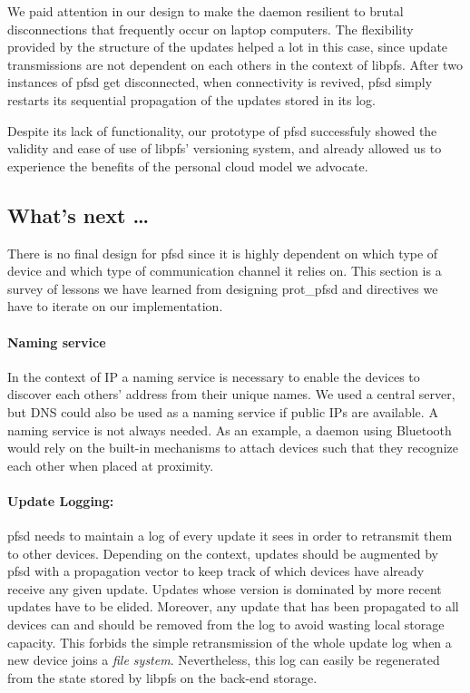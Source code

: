 We paid attention in our design to make the daemon resilient to brutal
disconnections that frequently occur on laptop computers. The
flexibility provided by the structure of the updates helped a lot in
this case, since update transmissions are not dependent on each others
in the context of libpfs. After two instances of pfsd get
disconnected, when connectivity is revived, pfsd simply restarts its
sequential propagation of the updates stored in its log.

Despite its lack of functionality, our prototype of pfsd successfuly
showed the validity and ease of use of libpfs' versioning system, and
already allowed us to experience the benefits of the personal cloud
model we advocate.

\subsection {What's next \ldots}
\label {subsec:depfsd}

There is no final design for pfsd since it is highly dependent on
which type of device and which type of communication channel it relies
on. This section is a survey of lessons we have learned from designing
prot\_pfsd and directives we have to iterate on our implementation.

\paragraph {Naming service}
In the context of IP a naming service is necessary to enable the
devices to discover each others' address from their unique names. We
used a central server, but DNS could also be used as a naming service
if public IPs are available. A naming service is not always needed. As
an example, a daemon using Bluetooth would rely on the built-in
mechanisms to attach devices such that they recognize each other when
placed at proximity.

\paragraph {Update Logging:}
pfsd needs to maintain a log of every update it sees in order to
retransmit them to other devices. Depending on the context, updates
should be augmented by pfsd with a propagation vector to keep track of
which devices have already receive any given update. Updates whose
version is dominated by more recent updates have to be
elided. Moreover, any update that has been propagated to all devices
can and should be removed from the log to avoid wasting local storage
capacity. This forbids the simple retransmission of the whole update
log when a new device joins a \emph{file system}. Nevertheless, this
log can easily be regenerated from the state stored by libpfs on the
back-end storage.

